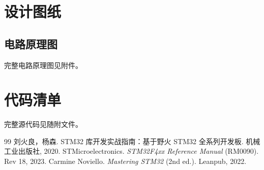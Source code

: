 
\appendix
\section{\centering 设计图纸}
\subsection*{电路原理图}
完整电路原理图见附件。

\section{\centering 代码清单}
完整源代码见随附文件。

\clearpage
{}
\begin{thebibliography}{99}
 刘火良，杨森. STM32 库开发实战指南：基于野火 STM32 全系列开发板. 机械工业出版社, 2020.
 STMicroelectronics. \textit{STM32F4xx Reference Manual} (RM0090). Rev 18, 2023.
 Carmine Noviello. \textit{Mastering STM32} (2nd ed.). Leanpub, 2022.
\end{thebibliography}


